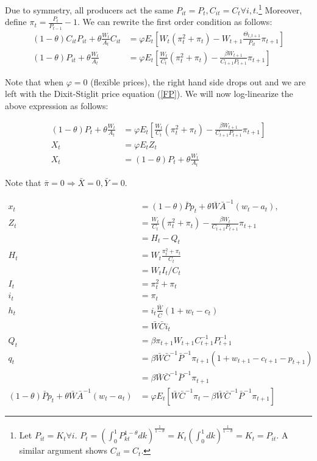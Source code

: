 \documentclass[11pt]{article} %
\begin{document}
Due to symmetry, all producers act the same $P_{it} = P_t,C_{it}=C_t \forall i,t$.\footnote{Let $P_{it} = K_t \forall i$. $P_t = \left(\int_{0}^1P_{kt}^{1-\theta}dk\right)^{\frac{1}{1-\theta}} = K_t\left(\int_{0}^1dk\right)^{\frac{1}{1-\theta}} = K_t = P_{it}.$ A similar argument shows $C_{it} = C_{t}$.} Moreover, define $\pi_t = \frac{P_t}{P_{t-1} }-1$. We can rewrite the first order condition as follows:
\begin{align*}
  (1-\theta)C_{it}P_{it} + \theta\frac{W_t}{A_t}C_{it} &=\varphi E_t\left[ W_{t}(\pi_t^2 + \pi_t) - W_{t+1}\frac{\Theta_{t,t+1}}{P_{it}}\pi_{t+1}  \right]\\
  (1-\theta)P_{it} + \theta\frac{W_t}{A_t} &=\varphi E_t\left[ \frac{W_{t}}{C_t}(\pi_t^2 + \pi_t) - \frac{\beta W_{t+1}}{C_{t+1}P_{t+1}}\pi_{t+1}  \right]
\end{align*}

Note that when $\varphi = 0$ (flexible prices), the right hand side drops out and we are left with the Dixit-Stiglit price equation (\ref{FP}). We will now log-linearize the above expression as follows:

\begin{align*}
 (1-\theta)P_{t} + \theta\frac{W_t}{A_t} &=\varphi E_t\left[ \frac{W_t}{C_t}(\pi_t^2 + \pi_t) - \frac{\beta W_{t+1}}{C_{t+1}P_{t+1}}\pi_{t+1}  \right]\\
X_t &= \varphi E_t Z_t\\
X_t &=  (1-\theta)P_{t} + \theta\frac{W_t}{A_t}
\end{align*}

Note that $\bar{\pi} = 0 \Rightarrow \bar{X} = 0, \bar{Y} = 0.$

\begin{align*}
x_t &= (1-\theta)\bar{P}p_t + \theta\bar{W}\bar{A}^{-1}(w_t - a_t),\\
Z_t &= \frac{W_t}{C_t}(\pi_t^2 + \pi_t) - \frac{\beta W_t}{C_{t+1}P_{t+1}}\pi_{t+1}\\
&= H_t - Q_t \\
H_t &= W_t\frac{\pi_t^2 + \pi_t}{C_t}\\
&= W_tI_t/C_t \\
I_t &= \pi_t^2 + \pi_t\\
i_t &= \pi_t\\
h_t &= i_t\frac{\bar{W}}{\bar{C}}(1+w_t-c_t)\\
&= \bar{W}{\bar{C}}i_t\\
Q_t &= \beta\pi_{t+1}W_{t+1}C_{t+1}^{-1}P_{t+1}^{-1}\\
q_t &= \beta\bar{W}\bar{C}^{-1}\bar{P}^{-1}\pi_{t+1}(1 + w_{t+1}-c_{t+1} - p_{t+1})\\
&= \beta\bar{W}\bar{C}^{-1}\bar{P}^{-1}\pi_{t+1}\\
(1-\theta)\bar{P}p_t + \theta\bar{W}\bar{A}^{-1}(w_t - a_t) &= \varphi E_t[ \bar{W}\bar{C}^{-1}\pi_t -  \beta\bar{W}\bar{C}^{-1}\bar{P}^{-1}\pi_{t+1}]
\end{align*}
\end{document}
